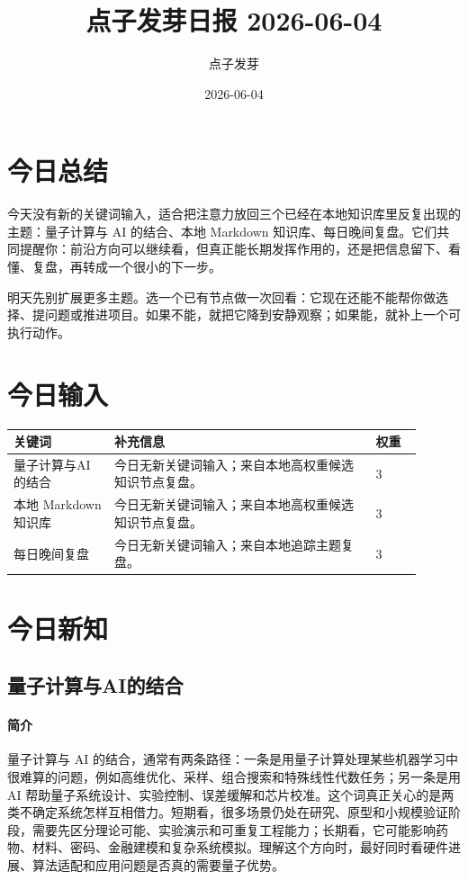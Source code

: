 \documentclass[UTF8,zihao=-4]{ctexart}
\title{\bfseries 点子发芽日报 2026-06-04}
\author{点子发芽}
\date{2026-06-04}
\begin{document}
\maketitle
\section*{今日总结}
今天没有新的关键词输入，适合把注意力放回三个已经在本地知识库里反复出现的主题：量子计算与 AI 的结合、本地 Markdown 知识库、每日晚间复盘。它们共同提醒你：前沿方向可以继续看，但真正能长期发挥作用的，还是把信息留下、看懂、复盘，再转成一个很小的下一步。

明天先别扩展更多主题。选一个已有节点做一次回看：它现在还能不能帮你做选择、提问题或推进项目。如果不能，就把它降到安静观察；如果能，就补上一个可执行动作。
\section*{今日输入}
\begin{longtable}{|p{0.22\linewidth}|p{0.58\linewidth}|p{0.10\linewidth}|}
\hline
\textbf{关键词} & \textbf{补充信息} & \textbf{权重} \\
\hline
量子计算与AI的结合 & 今日无新关键词输入；来自本地高权重候选知识节点复盘。 & 3 \\
\hline
本地 Markdown 知识库 & 今日无新关键词输入；来自本地高权重候选知识节点复盘。 & 3 \\
\hline
每日晚间复盘 & 今日无新关键词输入；来自本地追踪主题复盘。 & 3 \\
\hline
\end{longtable}
\section*{今日新知}
\subsection*{量子计算与AI的结合}
\paragraph{简介} 量子计算与 AI 的结合，通常有两条路径：一条是用量子计算处理某些机器学习中很难算的问题，例如高维优化、采样、组合搜索和特殊线性代数任务；另一条是用 AI 帮助量子系统设计、实验控制、误差缓解和芯片校准。这个词真正关心的是两类不确定系统怎样互相借力。短期看，很多场景仍处在研究、原型和小规模验证阶段，需要先区分理论可能、实验演示和可重复工程能力；长期看，它可能影响药物、材料、密码、金融建模和复杂系统模拟。理解这个方向时，最好同时看硬件进展、算法适配和应用问题是否真的需要量子优势。
\end{document}
